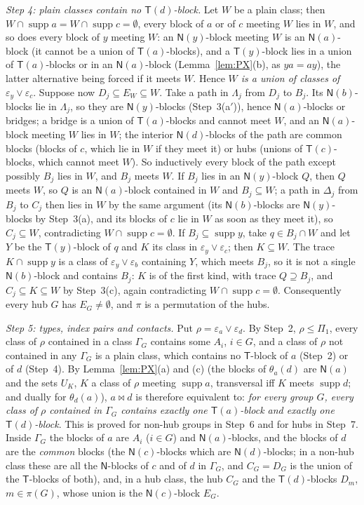\documentclass[11pt]{amsart}
\theoremstyle{definition}
\newcommand{\supp}{\operatorname{supp}}
\newcommand{\T}{\mathsf{T}}
\newcommand{\N}{\mathsf{N}}
\newcommand{\mt}{\bowtie}   %
\begin{document}
\smallskip
\emph{Step 4: plain classes contain no $\T(d)$-block.} Let $W$ be a plain class; then $W\cap\supp a=W\cap\supp c=\emptyset$, every block of $a$ or of $c$ meeting $W$ lies in $W$, and so does every block of $y$ meeting $W$: an $\N(y)$-block meeting $W$ is an $\N(a)$-block (it cannot be a union of $\T(a)$-blocks), and a $\T(y)$-block lies in a union of $\T(a)$-blocks or in an $\N(a)$-block (Lemma~\ref{lem:PX}(b), as $ya=ay$), the latter alternative being forced if it meets $W$. Hence \emph{$W$ is a union of classes of $\varepsilon_y\vee\varepsilon_c$}. Suppose now $D_j\subseteq E_W\subseteq W$. Take a path in $\Lambda_j$ from $D_j$ to $B_j$. Its $\N(b)$-blocks lie in $\Lambda_j$, so they are $\N(y)$-blocks (Step~3(a$'$)), hence $\N(a)$-blocks or bridges; a bridge is a union of $\T(a)$-blocks and cannot meet $W$, and an $\N(a)$-block meeting $W$ lies in $W$; the interior $\N(d)$-blocks of the path are common blocks (blocks of $c$, which lie in $W$ if they meet it) or hubs (unions of $\T(c)$-blocks, which cannot meet $W$). So inductively every block of the path except possibly $B_j$ lies in $W$, and $B_j$ meets $W$. If $B_j$ lies in an $\N(y)$-block $Q$, then $Q$ meets $W$, so $Q$ is an $\N(a)$-block contained in $W$ and $B_j\subseteq W$; a path in $\Delta_j$ from $B_j$ to $C_j$ then lies in $W$ by the same argument (its $\N(b)$-blocks are $\N(y)$-blocks by Step~3(a), and its blocks of $c$ lie in $W$ as soon as they meet it), so $C_j\subseteq W$, contradicting $W\cap\supp c=\emptyset$. If $B_j\subseteq\supp y$, take $q\in B_j\cap W$ and let $Y$ be the $\T(y)$-block of $q$ and $K$ its class in $\varepsilon_y\vee\varepsilon_c$; then $K\subseteq W$. The trace $K\cap\supp y$ is a class of $\varepsilon_y\vee\varepsilon_b$ containing $Y$, which meets $B_j$, so it is not a single $\N(b)$-block and contains $B_j$: $K$ is of the first kind, with trace $Q\supseteq B_j$, and $C_j\subseteq K\subseteq W$ by Step~3(c), again contradicting $W\cap\supp c=\emptyset$. Consequently every hub $G$ has $E_G\ne\emptyset$, and $\pi$ is a permutation of the hubs.

\smallskip
\emph{Step 5: types, index pairs and contacts.} Put $\rho=\varepsilon_a\vee\varepsilon_d$. By Step~2, $\rho\le\Pi_1$, every class of $\rho$ contained in a class $\Gamma_G$ contains some $A_i$, $i\in G$, and a class of $\rho$ not contained in any $\Gamma_G$ is a plain class, which contains no $\T$-block of $a$ (Step~2) or of $d$ (Step~4). By Lemma~\ref{lem:PX}(a) and (c) (the blocks of $\theta_a(d)$ are $\N(a)$ and the sets $U_K$, $K$ a class of $\rho$ meeting $\supp a$, transversal iff $K$ meets $\supp d$; and dually for $\theta_d(a)$), $a\mt d$ is therefore equivalent to: \emph{for every group $G$, every class of $\rho$ contained in $\Gamma_G$ contains exactly one $\T(a)$-block and exactly one $\T(d)$-block}. This is proved for non-hub groups in Step~6 and for hubs in Step~7. Inside $\Gamma_G$ the blocks of $a$ are $A_i$ ($i\in G$) and $\N(a)$-blocks, and the blocks of $d$ are the \emph{common} blocks (the $\N(c)$-blocks which are $\N(d)$-blocks; in a non-hub class these are all the $\N$-blocks of $c$ and of $d$ in $\Gamma_G$, and $C_G=D_G$ is the union of the $\T$-blocks of both), and, in a hub class, the hub $C_G$ and the $\T(d)$-blocks $D_m$, $m\in\pi(G)$, whose union is the $\N(c)$-block $E_G$.
\end{document}
